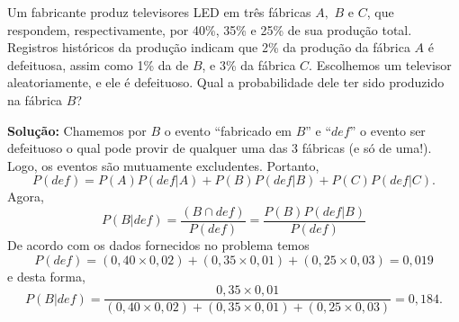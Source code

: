 \begin{frame}
\begin{exem}
	Um fabricante produz televisores LED em três fábricas $A,$ $B$ e $C$, que respondem, respectivamente, por 40\%, 35\% e 25\% de sua produção total.
	Registros históricos da produção indicam que 2\% da produção da fábrica $A$  é defeituosa, assim como 1\% da de $B$, e 3\% da fábrica $C.$ Escolhemos um televisor aleatoriamente, e ele é defeituoso. Qual a probabilidade dele ter sido produzido na fábrica $B$?
\end{exem}	
	
	{\bf Solução:} Chamemos por $B$ o evento ``fabricado em $B$'' e ``$def$'' o evento ser defeituoso o qual pode provir de qualquer uma das 3 fábricas (e só de uma!). Logo, os eventos são mutuamente excludentes. Portanto, 
	$$
	P(def) = P(A)P(def | A)+P(B)P(def|B) + P(C)P(def|C). 
	$$
	Agora, 
	$$
	P(B|def) = \frac{(B \cap def)}{P(def)}= \frac{P(B)P(def | B)}{P(def)}
	$$
	De acordo com os dados fornecidos no problema temos
	$$
	P( def ) = ( 0,40 \times 0,02 ) + ( 0,35 \times 0,01 ) + ( 0,25 \times 0,03 ) = 0,019
	$$
	e desta forma, 
	$$
	P(B|def) = \frac{0,35 \times 0,01}{( 0,40 \times 0,02 ) + ( 0,35\times 0,01 ) + ( 0,25 \times 0,03 )}= 0,184.
	$$

\end{frame}
	
